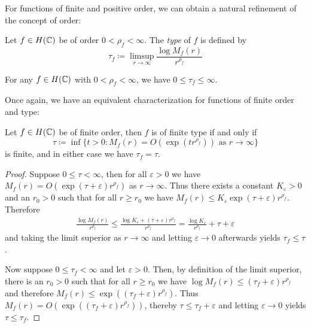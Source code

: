 For functions of finite and positive order, we can obtain a natural refinement of the concept of order:

\begin{definition}
    Let $f \in H(\mathbb{C})$ be of order $0 < \rho_f < \infty$. The \emph{type} of $f$ is defined by
    \begin{equation} \label{eq:def-type}
        \tau_f \coloneqq \limsup_{r \to \infty} \frac{\log M_f(r)}{r^{\rho_f}}
    \end{equation}
\end{definition}

For any $f \in H(\mathbb{C})$ with $0 < \rho_f < \infty$, we have $0 \leq \tau_f \leq \infty$.

Once again, we have an equivalent characterization for functions of finite order and type:

\begin{proposition} \label{prop:type-infimum}
    Let $f \in H(\mathbb{C})$ be of finite order, then $f$ is of finite type if and only if
    \begin{equation}
        \tau \coloneqq \inf \{ t > 0 : M_f(r) = O(\exp (t r^{\rho_f})) \textrm{ as } r \to \infty \}
    \end{equation}
    is finite, and in either case we have $\tau_f = \tau$.
\end{proposition}

\begin{proof}
    Suppose $0 \leq \tau < \infty$, then for all $\varepsilon > 0$ we have $M_f(r) = O(\exp (\tau + \varepsilon) r^{\rho_f})$ as $r \to \infty$. Thus there exists a constant $K_\varepsilon > 0$ and an $r_0 > 0$ such that for all $r \geq r_0$ we have $M_f(r) \leq K_\varepsilon \exp (\tau + \varepsilon) r^{\rho_f}$. Therefore
    \begin{align*}
        \frac{\log M_f(r)}{r^{\rho_f}} \leq \frac{\log K_\varepsilon + (\tau + \varepsilon) r^{\rho_f}}{r^{\rho_f}} = \frac{\log K_\varepsilon}{r^{\rho_f}} + \tau + \varepsilon
    \end{align*}
    and taking the limit superior as $r \to \infty$ and letting $\varepsilon \to 0$ afterwards yields $\tau_f \leq \tau$.

    Now suppose $0 \leq \tau_f < \infty$ and let $\varepsilon > 0$. Then, by definition of the limit superior, there is an $r_0 > 0$ such that for all $r \geq r_0$ we have $ \log M_f(r) \leq (\tau_f + \varepsilon) r^{\rho_f}$ and therefore $M_f(r) \leq \exp((\tau_f + \varepsilon) r^{\rho_f})$. Thus $M_f(r) = O(\exp ((\tau_f + \varepsilon) r^{\rho_f}))$, thereby $\tau \leq \tau_f + \varepsilon$ and letting $\varepsilon \to 0$ yields $\tau \leq \tau_f$.
\end{proof}

